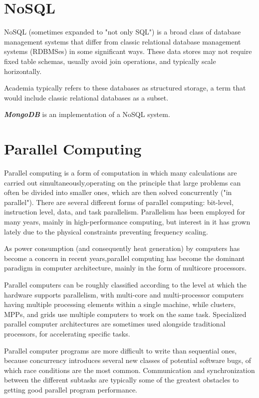 \documentclass[11pt]{article} %
\begin{document}
\section{NoSQL}

NoSQL (sometimes expanded to "not only SQL") is a broad class of database management systems that differ from classic relational database management systems (RDBMSes) in some significant ways. These data stores may not require fixed table schemas, usually avoid join operations, and typically scale horizontally.

Academia typically refers to these databases as structured storage, a term that would include classic relational databases as a subset.

\textbf{\textit{MongoDB}} is an implementation of a NoSQL system.
\newpage
\section{Parallel Computing}
Parallel computing is a form of computation in which many calculations are carried out simultaneously,operating on the principle that large problems can often be divided into smaller ones, which are then solved concurrently ("in parallel"). There are several different forms of parallel computing: bit-level, instruction level, data, and task parallelism. Parallelism has been employed for many years, mainly in high-performance computing, but interest in it has grown lately due to the physical constraints preventing frequency scaling.

As power consumption (and consequently heat generation) by computers has become a concern in recent years,parallel computing has become the dominant paradigm in computer architecture, mainly in the form of multicore processors.

Parallel computers can be roughly classified according to the level at which the hardware supports parallelism, with multi-core and multi-processor computers having multiple processing elements within a single machine, while clusters, MPPs, and grids use multiple computers to work on the same task. Specialized parallel computer architectures are sometimes used alongside traditional processors, for accelerating specific tasks.

Parallel computer programs are more difficult to write than sequential ones, because concurrency introduces several new classes of potential software bugs, of which race conditions are the most common. Communication and synchronization between the different subtasks are typically some of the greatest obstacles to getting good parallel program performance.
\end{document}
